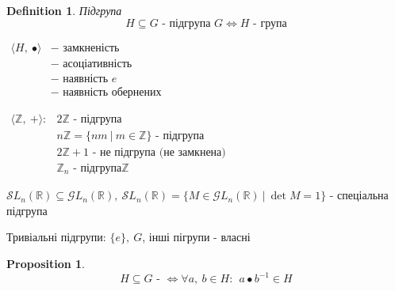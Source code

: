 \documentclass[a4paper,12pt, centered]{bookest}
\newtheorem{definition}{Definition}[section]
\newtheorem*{prop*}{Proposition}
\begin{document}
\begin{definition}Підгрупа
	$$H\subseteq G\textrm{ - підгрупа }G\Leftrightarrow H\textrm{ - група}$$
	\begin{center}
		$\begin{array}{cl}
		\langle H,\>\bullet\rangle & - \textrm{ замкненість}\\
			 & - \textrm{ асоціативність}\\
			  & - \textrm{ наявність }e\\
			   & - \textrm{ наявність обернених}
	\end{array}$
	\end{center}	
\end{definition}
\begin{example}
	$\begin{array}{cl}
		\langle\mathbb{Z},\>+\rangle: & 2\mathbb{Z}\textrm{ - підгрупа}\\
		& n\mathbb{Z}=\{nm\>|\>m\in\mathbb{Z}\}\textrm{ - підгрупа}\\
		& 2\mathbb{Z}+1\textrm{ - не підгрупа (не замкнена)}\\
		& \mathbb{Z}_n\textrm{ - підгрупа}\mathbb{Z}
	\end{array}$
\end{example}
\begin{example}
	$\mathcal{S}L_n(\mathbb{R})\subseteq\mathcal{G}L_n(\mathbb{R}),\> \mathcal{S}L_n(\mathbb{R})=\{M\in\mathcal{G}L_n(\mathbb{R})\>|\>\det M=1\}$ - спеціальна підгрупа
\end{example}
Тривіальні підгрупи: $\{e\},\>G$, інші пігрупи - власні
\begin{prop*}
	$$H\subseteq G\textrm{ - }\Leftrightarrow\forall a,\>b\in H:\>\>a\bullet b^{-1}\in H$$
\end{prop*}
\end{document}
